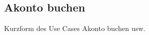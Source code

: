 \documentclass[../SubfileFeatures.tex]{subfiles}
\begin{document}
    \subsection{Akonto buchen}
    Kurzform des Use Cases Akonto buchen usw.
\end{document}
